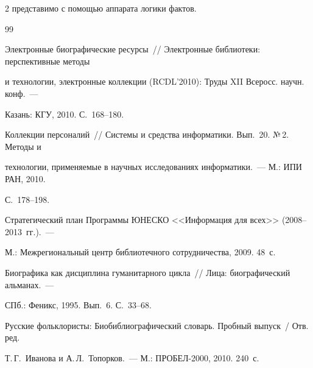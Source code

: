 \begin{multicols}{2}
представимо с помощью аппарата логики фактов.





{\small\frenchspacing


{%




\begin{thebibliography}{99}









Электронные биографические ресурсы~// Электронные библиотеки: перспективные методы 


и технологии, электронные коллекции (RCDL'2010): Труды XII Всеросс. научн. конф.~--- 


Казань: КГУ, 2010. С.~168--180.






Коллекции персоналий~// Системы и средства информатики. Вып.~20. №\,2. Методы и 


технологии, применяемые в научных исследованиях информатики.~--- М.: ИПИ РАН, 2010. 


С.~178--198.







Стратегический план Программы ЮНЕСКО <<Информация для всех>> (2008--2013~гг.).~--- 


М.: Межрегиональный центр библиотечного сотрудничества, 2009. 48~с.









Биографика как дисциплина гуманитарного цикла~// Лица: биографический альманах.~--- 


СПб.: Феникс, 1995. Вып.~6. С.~33--68.







Русские фольклористы: Биобиблиографический словарь. Пробный выпуск~/ Отв. ред. 


Т.\,Г.~Иванова и А.\,Л.~Топорков.~--- М.: ПРОБЕЛ-2000, 2010. 240~с. 






\end{thebibliography}}}
\end{multicols}
